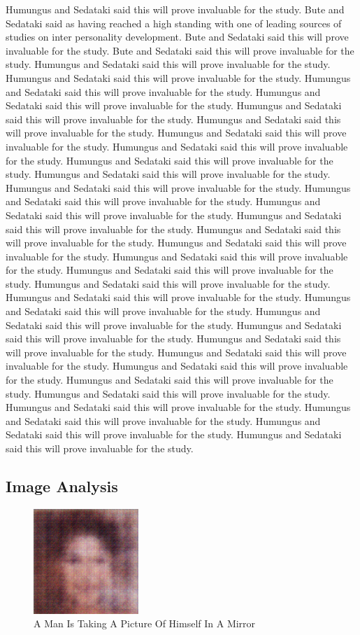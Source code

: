 \documentclass{article}%
\begin{document}
Humungus and Sedataki said this will prove invaluable for the study. Bute and Sedataki said as having reached a high standing with one of leading sources of studies on inter personality development. Bute and Sedataki said this will prove invaluable for the study. Bute and Sedataki said this will prove invaluable for the study. Humungus and Sedataki said this will prove invaluable for the study. Humungus and Sedataki said this will prove invaluable for the study. Humungus and Sedataki said this will prove invaluable for the study. Humungus and Sedataki said this will prove invaluable for the study. Humungus and Sedataki said this will prove invaluable for the study. Humungus and Sedataki said this will prove invaluable for the study. Humungus and Sedataki said this will prove invaluable for the study. Humungus and Sedataki said this will prove invaluable for the study. Humungus and Sedataki said this will prove invaluable for the study. Humungus and Sedataki said this will prove invaluable for the study. Humungus and Sedataki said this will prove invaluable for the study. Humungus and Sedataki said this will prove invaluable for the study. Humungus and Sedataki said this will prove invaluable for the study. Humungus and Sedataki said this will prove invaluable for the study. Humungus and Sedataki said this will prove invaluable for the study. Humungus and Sedataki said this will prove invaluable for the study. Humungus and Sedataki said this will prove invaluable for the study. Humungus and Sedataki said this will prove invaluable for the study. Humungus and Sedataki said this will prove invaluable for the study. Humungus and Sedataki said this will prove invaluable for the study. Humungus and Sedataki said this will prove invaluable for the study. Humungus and Sedataki said this will prove invaluable for the study. Humungus and Sedataki said this will prove invaluable for the study. Humungus and Sedataki said this will prove invaluable for the study. Humungus and Sedataki said this will prove invaluable for the study. Humungus and Sedataki said this will prove invaluable for the study. Humungus and Sedataki said this will prove invaluable for the study. Humungus and Sedataki said this will prove invaluable for the study. Humungus and Sedataki said this will prove invaluable for the study. Humungus and Sedataki said this will prove invaluable for the study. Humungus and Sedataki said this will prove invaluable for the study. Humungus and Sedataki said this will prove invaluable for the study.

%
\subsection{Image Analysis}%
\label{subsec:ImageAnalysis}%


\begin{figure}[h!]%
\centering%
\includegraphics[width=150px]{500_fake_images/samples_5_55.png}%
\caption{A Man Is Taking A Picture Of Himself In A Mirror}%
\end{figure}

%
\end{document}
